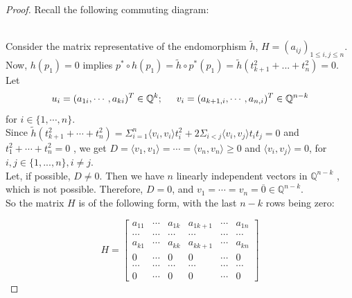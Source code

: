 \documentclass[a4paper,leqno,12pt]{amsart}
\theoremstyle{plain}
\theoremstyle{definition}
\theoremstyle{remark}
\newcommand{\Q}{\mathbb{Q}}
\begin{document}
{\begin{proof}
Recall the following commuting diagram: \\
\\
Consider the matrix representative of the endomorphism $\widetilde{h}$,   $H = (a_{ij})_{1 \leq i, j \leq n}$.  \\
\noindent
Now,  $h(p_{1})=0$ implies $p^{*}\circ h(p_{1})= \widetilde{h}\circ p^{*}(p_{1})=\widetilde{h}(t_{k+1}^{2}+...+t_{n}^{2})=0$.\\
\noindent
Let 
\begin{equation}
u_{i} =    (a_{1i} ,  \cdots ,  a_{ki})^{T}  
\in \mathbb{Q}^{k} ; \hspace{0.5cm}  v_{i} = (a_{k+1,i},  \cdots ,  a_{n,i})^{T} \in \mathbb{Q}^{n-k}           
\nonumber
\end{equation}
for $i \in \{ 1,  \cdots,n \}$.  \\
Since 
$\widetilde{h}(t_{k+1}^{2}+ \cdots +t_{n}^{2})= \Sigma_{i=1}^{n}\langle v_{i},v_{i}\rangle t_{i}^{2}+ 2\Sigma_{ i<j} \langle v_{i} , v_{j} \rangle t_{i}t_{j} =0$
and $t_{1}^{2}+ \cdots +t_{n}^{2}=0$ ,  we get $D =  \langle v_{1}, v_{1} \rangle = \cdots = \langle v_{n},v_{n}\rangle \geq 0 $ and $ \langle v_{i}, v_{j} \rangle = 0$,  for $ i, j \in \{ 1,...,n\},   i \neq j$. \\
   
\noindent
Let,  if possible,  $D \neq 0$.  Then we have $n$ linearly independent vectors in $\Q^{n-k}$ ,  which is not possible.  Therefore,  $D=0$,  and $v_{1}= \cdots =v_{n}=\overline{0} \in \Q^{n-k}$. \\

\noindent
So the matrix $H$ is of the following form,  with the last $n-k$ rows being zero:  

\begin{equation}
H=
\begin{bmatrix}
 a_{11} &   \cdots & a_{1k} & a_{1 k+1} & \cdots & a_{1n} \\
 \cdots &   \cdots& \cdots & \cdots & \cdots& \cdots \\
 a_{k1}  &    \cdots &  a_{kk} &  a_{k k+1} & \cdots & a_{kn} \\
  0  &    \cdots &  0 &  0 & \cdots & 0 \\
 \cdots &   \cdots& \cdots & \cdots & \cdots& \cdots  \\
  0 &   \cdots & 0 & 0 & \cdots & 0
\end{bmatrix}
\nonumber 
\end{equation}


\end{proof}}
\end{document}
